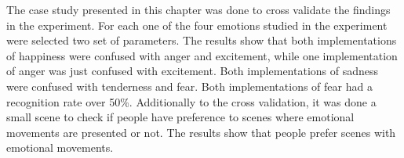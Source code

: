 The case study presented in this chapter was done to cross validate the findings in the experiment. For each one of the four emotions studied in the experiment were selected two set of parameters. The results show that both implementations of happiness were confused with anger and excitement, while one implementation of anger was just confused with excitement. Both implementations of sadness were confused with tenderness and fear. Both implementations of fear had a recognition rate over 50\%. Additionally to the cross validation, it was done a small scene to check if people have preference to scenes where emotional movements are presented or not. The results show that people prefer scenes with emotional movements. 